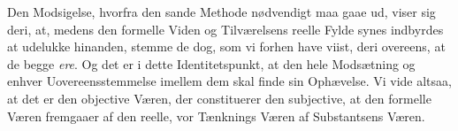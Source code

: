 \documentclass[12pt]{book}
\newcommand{\opage}[1]{\marginnote{\footnotesize\textit{[#1]}}}
\begin{document}
\opage{37} Den Modsigelse, hvorfra den sande Methode nødvendigt maa gaae ud, viser sig
deri, at, medens den formelle Viden og Tilværelsens reelle Fylde synes
indbyrdes at udelukke hinanden, stemme de dog, som vi forhen have viist, deri
overeens, at de begge \emph{ere}. Og det er i dette Identitetspunkt, at den
hele Modsætning og enhver Uovereensstemmelse imellem dem skal finde sin
Ophævelse. Vi vide altsaa, at det er den objective Væren, der constituerer den
subjective, at den formelle Væren fremgaaer af den reelle, vor Tænknings Væren
af Substantsens Væren.
\end{document}
